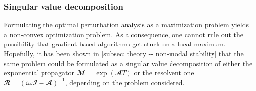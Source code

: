   \subsubsection{Singular value decomposition}

  Formulating the optimal perturbation analysis as a maximization problem yields a non-convex optimization problem. As a consequence, one cannot rule out the possibility that gradient-based algorithms get stuck on a local maximum. Hopefully, it has been shown in \textsection \ref{subsec: theory -- non-modal stability} that the same problem could be formulated as a singular value decomposition of either the exponential propagator $\mathbfcal{M} = \exp \left( \mathbfcal{A} T \right)$ or the resolvent one $\mathbfcal{R} = \left( i \omega \mathbfcal{I} - \mathbfcal{A} \right)^{-1}$, depending on the problem considered.

